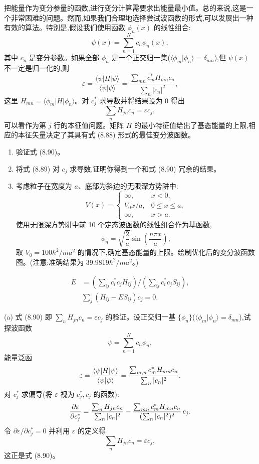 \begin{question}
把能量作为变分参量的函数,进行变分计算需要求出能量最小值。总的来说,这是一个非常困难的问题。然而,如果我们合理地选择尝试波函数的形式,可以发展出一种有效的算法。特别是,假设我们使用函数 $\phi_n(x)$ 的线性组合:
\[
\psi(x)=\sum_{n=1}^N c_n\phi_n(x),
\]
其中 $c_n$ 是变分参数。如果全部 $\phi_n$ 是一个正交归一集($\langle\phi_m|\phi_n\rangle=\delta_{mn}$),但 $\psi(x)$ 不一定是归一化的,则
\[
\varepsilon=\frac{\langle\psi|H|\psi\rangle}{\langle\psi|\psi\rangle}=
\frac{\sum_{mn}c_m^*H_{mn}c_n}{\sum_n |c_n|^2},
\]
这里 $H_{mn}=\langle\phi_m|H|\phi_n\rangle$。对 $c_j^*$ 求导数并将结果设为 0 得出
\[
\sum_n H_{jn}c_n=\varepsilon c_j,
\]
可以看作为第 $j$ 行的本征值问题。矩阵 $H$ 的最小特征值给出了基态能量的上限,相应的本征矢量决定了其具有式 (8.88) 形式的最佳变分波函数。
\begin{enumerate}
\item 验证式 (8.90)。
\item 将式 (8.89) 对 $c_j$ 求导数,证明你得到一个和式 (8.90) 冗余的结果。
\item 考虑粒子在宽度为 $a$、底部为斜边的无限深方势阱中:
\[
V(x)=\begin{cases}
\infty, & x<0,\\
V_0x/a, & 0\le x\le a,\\
\infty, & x>a.
\end{cases}
\]
使用无限深方势阱中前 10 个定态波函数的线性组合作为基函数,
\[
\phi_n=\sqrt{\frac2a}\sin\left(\frac{n\pi x}{a}\right),
\]
取 $V_0=100\hbar^2/ma^2$ 的情况下,确定基态能量的上限。绘制优化后的变分波函数图。(注意:准确结果为 $39.9819\hbar^2/ma^2$。)
\end{enumerate}

\par\smallskip
{}\[\begin{aligned}E&=(\sum_{\ii j}c_i^*c_jH_{\ii j})/(\sum_{\ii j}c_i^*c_jS_{\ii j}),\\&\sum_j(H_{\ii j}-ES_{\ii j})c_j=0.\end{aligned}\]

\begin{solution}
(a) 式 (8.90) 即 $\sum_n H_{jn}c_n=\varepsilon c_j$ 的验证。设正交归一基 $\{\phi_n\}$($\langle\phi_m|\phi_n\rangle=\delta_{mn}$),试探波函数
\[
\psi=\sum_{n=1}^N c_n\phi_n,
\]
能量泛函
\[
\varepsilon={\langle\psi|H|\psi\rangle\over\langle\psi|\psi\rangle}
={\sum_{m,n}c_m^*H_{mn}c_n\over\sum_n|c_n|^2}.
\]
对 $c_j^*$ 求偏导(将 $\varepsilon$ 视为 $c_j^*,c_j$ 的函数):
\[
{\partial\varepsilon\over\partial c_j^*}=
{\sum_n H_{jn}c_n\over\sum_n|c_n|^2}-
{\sum_{mn}c_m^*H_{mn}c_n\over(\sum_n|c_n|^2)^2}\,c_j.
\]
令 $\partial\varepsilon/\partial c_j^*=0$ 并利用 $\varepsilon$ 的定义得
\[
\sum_n H_{jn}c_n=\varepsilon c_j,
\]
这正是式 (8.90)。


\end{solution}
\end{question}
